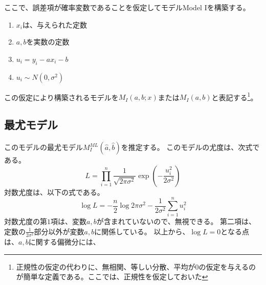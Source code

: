 ここで、誤差項が確率変数であることを仮定してモデルModel Iを構築する。
\begin{enumerate}
 \item $x_i$は、与えられた定数
 \item $a,b$を実数の定数
 \item $u_i = y_i-a x_i -b$
 \item $u_i \sim N(0,\sigma^2)$
\end{enumerate}
この仮定により構築されるモデルを$M_{I}(a,b; x)$または$M_I(a,b)$と表記する\footnote{正規性の仮定の代わりに、無相関、等しい分散、平均が$0$の仮定を与えるのが簡単な定義である。ここでは、正規性を仮定しておいた}。

\subsection{最尤モデル}
このモデルの最尤モデル$M_{I}^{ML}(\hat{a},\hat{b})$を推定する。
このモデルの尤度は、次式である。
\begin{equation*}
 L = \prod_{i=1}^{n} \frac{1}{\sqrt{2\pi\sigma^2}}\exp\left(-\frac{u_i^2}{2\sigma^2} \right)
\end{equation*}
対数尤度は、以下の式である。
\begin{equation*}
 \log L = -\frac{n}{2}\log 2\pi\sigma^2-\frac{1}{2\sigma^2} \sum_{i=1}^n u_i^2
\end{equation*}
対数尤度の第$1$項は、変数$a,b$が含まれていないので、無視できる。
第二項は、定数の$\frac{1}{2\sigma^2}$部分以外が変数$a,b$に関係している。
以上から、$\log L =0$となる点は、$a,b$に関する偏微分には、

\fi

